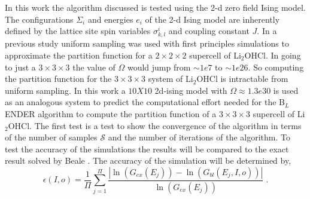 \documentclass[aps,prl,reprint,superscriptaddress,showkeys]{revtex4-1}
\begin{document}
In this work the algorithm discussed is tested using the 2-d zero field  Ising model.  The configurations $\Sigma_i$ and energies $e_i$ of the 2-d Ising model are inherently defined by the lattice site spin variables $\sigma^i_{k,l}$ and coupling constant $J$. In a previous study uniform sampling was used with first principles simulations to approximate the partition function for a $2\times 2\times 2$ supercell  of Li$_2$OHCl. In going to just a $3\times 3\times 3$ the value of $\Omega$ would jump from $\sim1e7$ to  $\sim1e26$. So computing the partition function for the $3\times 3\times 3$ system of Li$_2$OHCl is intractable from uniform sampling. In this work a $10X10$ 2d-ising model with $\Omega \approx 1.3e30$ is used as an analogous system to predict the computational effort needed for the B$_L$ENDER algorithm to compute the partition function of a  $3\times 3\times 3$ supercell of Li$_2$OHCl.  The first test is a test to show the convergence of the algorithm in terms of the number of samples $\mathcal{S}$ and the number of iterations of the algorithm. To test the accuracy of the simulations the results will be compared to the exact result solved by Beale \cite{Beale_2d_ising}. The accuracy of the simulation will be determined by, 
\begin{equation}
\epsilon(I,o)  = \frac{1}{\Pi} \sum_{j=1}^{\Pi}\frac{|\ln(G_{ex}(E_j))- \ln(G_{bl}(E_j,I,o))|}{\ln(G_{ex}(E_j))}\; . 
\end{equation}
\end{document}
